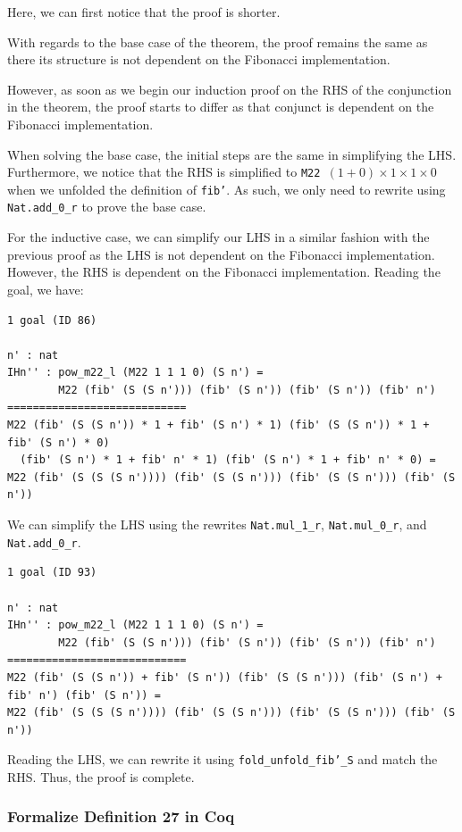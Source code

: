 \documentclass{article}
\begin{document}
Here, we can first notice that the proof is shorter. 

With regards to the base case of the theorem, the proof remains the same as there its structure is not dependent on the Fibonacci implementation. 

However, as soon as we begin our induction proof on the RHS of the conjunction in the theorem, the proof starts to differ as that conjunct is dependent on the Fibonacci implementation.

When solving the base case, the initial steps are the same in simplifying the LHS. Furthermore, we notice that the RHS is simplified to \texttt{M22 $(1 + 0) \times 1 \times 1 \times 0$} when we unfolded the definition of \texttt{fib'}. As such, we only need to rewrite using \texttt{Nat.add\_0\_r} to prove the base case.

For the inductive case, we can simplify our LHS in a similar fashion with the previous proof as the LHS is not dependent on the Fibonacci implementation. However, the RHS is dependent on the Fibonacci implementation. Reading the goal, we have:

\begin{lstlisting}
1 goal (ID 86)

n' : nat
IHn'' : pow_m22_l (M22 1 1 1 0) (S n') =
        M22 (fib' (S (S n'))) (fib' (S n')) (fib' (S n')) (fib' n')
============================
M22 (fib' (S (S n')) * 1 + fib' (S n') * 1) (fib' (S (S n')) * 1 + fib' (S n') * 0)
  (fib' (S n') * 1 + fib' n' * 1) (fib' (S n') * 1 + fib' n' * 0) =
M22 (fib' (S (S (S n')))) (fib' (S (S n'))) (fib' (S (S n'))) (fib' (S n'))
\end{lstlisting}

We can simplify the LHS using the rewrites \texttt{Nat.mul\_1\_r}, \texttt{Nat.mul\_0\_r}, and \texttt{Nat.add\_0\_r}. 

\begin{lstlisting}
1 goal (ID 93)

n' : nat
IHn'' : pow_m22_l (M22 1 1 1 0) (S n') =
        M22 (fib' (S (S n'))) (fib' (S n')) (fib' (S n')) (fib' n')
============================
M22 (fib' (S (S n')) + fib' (S n')) (fib' (S (S n'))) (fib' (S n') + fib' n') (fib' (S n')) =
M22 (fib' (S (S (S n')))) (fib' (S (S n'))) (fib' (S (S n'))) (fib' (S n'))
\end{lstlisting}

Reading the LHS, we can rewrite it using \texttt{fold\_unfold\_fib'\_S} and match the RHS. Thus, the proof is complete.

\subsubsection{Formalize Definition 27 in Coq}
\end{document}
